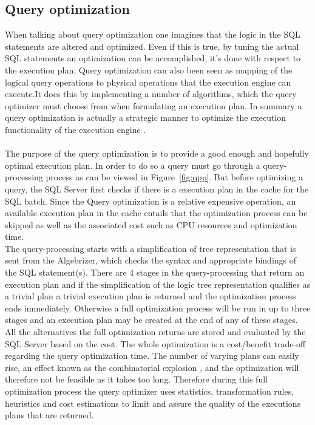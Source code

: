 \documentclass{cslthse-msc}
\begin{document}
\subsection{Query optimization}\label{sec:qopt}
When talking about query optimization one imagines that the logic in the SQL statements are altered and optimized. Even if this is true, by tuning the actual SQL statements an optimization can be accomplished, it's done with respect to the execution plan. Query optimization can also been seen as mapping of the logical query operations to physical operations that the execution engine can execute.It does this by implementing a number of algorithms, which the query optimizer must choose from when formulating an execution plan. In summary a query optimization is actually a strategic manner to optimize the execution functionality of the execution engine   \cite{Nevarez}. \\\\ 
The purpose of the query optimization is to provide a good enough and hopefully optimal execution plan. In order to do so a query must go through a query-processing process as can be viewed in Figure~\ref{fig:qpp}. But before optimizing a query, the SQL Server first checks if there is a execution plan in the cache for the SQL batch. Since the Query optimization is a relative expensive operation, an available execution plan in the cache entails that the optimization process can be skipped as well as the associated cost such as CPU resources and optimization time.\\ The query-processing starts with a simplification of tree representation that is sent from the Algebrizer, which checks the syntax and appropriate bindings of the SQL statement(s). There are 4 stages in the query-processing that return an execution plan and if the simplification of the logic tree representation qualifies as a trivial plan a trivial execution plan is returned and the optimization process ends immediately. Otherwise a full optimization process will be run in up to three stages and an execution plan may be created at the end of any of these stages. All the alternatives the full optimization returns are stored and evaluated by the SQL Server based on the cost. The whole optimization is a cost/benefit trade-off regarding the query optimization time. The number of varying plans can easily rise, an effect known as the combinatorial explosion   \cite{combo}, and the optimization will therefore not be feasible as it takes too long. Therefore during this full optimization process the query optimizer uses statistics, transformation rules, heuristics and cost estimations to limit and assure the quality of the executions plans that are returned.\\\\ 
\end{document}
